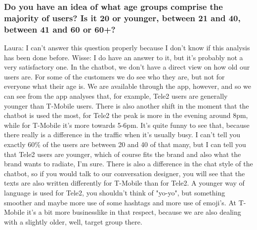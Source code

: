 \begin{appendices}
	\subsubsection{Do you have an idea of what age groups comprise the majority of users? Is
		it 20 or younger, between 21 and 40, between 41 and 60 or 60+?}
	Laura: I can't answer this question properly because I don't know if this analysis has been done before. 
	Wisse: I do have an answer to it, but it's probably not a very satisfactory one. In the chatbot, we don't have a direct view on how old our users are. For some of the customers we do see who they are, but not for everyone what their age is. We are available through the app, however, and so we can see from the app analyses that, for example, Tele2 users are generally younger than T-Mobile users. There is also another shift in the moment that the chatbot is used the most, for Tele2 the peak is more in the evening around 8pm, while for T-Mobile it's more towards 5-6pm. It's quite funny to see that, because there really is a difference in the traffic when it's usually busy. I can't tell you exactly 60\% of the users are between 20 and 40 of that many, but I can tell you that Tele2 users are younger, which of course fits the brand and also what the brand wants to radiate, I'm sure. There is also a difference in the chat style of the chatbot, so if you would talk to our conversation designer, you will see that the texts are also written differently for T-Mobile than for Tele2. A younger way of language is used for Tele2, you shouldn't think of "yo-yo", but something smoother and maybe more use of some hashtags and more use of emoji's. At T-Mobile it's a bit more businesslike in that respect, because we are also dealing with a slightly older, well, target group there.\\

\end{appendices}
